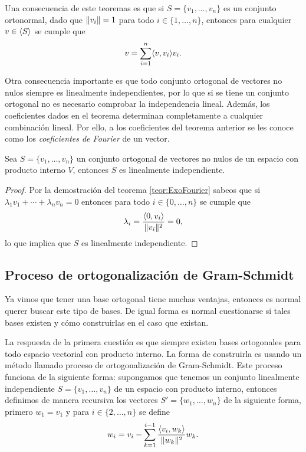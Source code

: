 Una consecuencia de este teoremas es que si $S = \{v_1, \ldots, v_n\}$ es un conjunto ortonormal, dado que $\mathopen\|v_i\mathclose\| = 1$ para todo $i\in\{1,\ldots,n\}$, entonces para cualquier $v\in \langle S\rangle$ se cumple que 
\[
  v = \sum_{i=1}^n \langle v,v_i\rangle v_i.
\]

Otra consecuencia importante es que todo conjunto ortogonal de vectores no nulos siempre es linealmente independientes, por lo que si se tiene un conjunto ortogonal no es necesario comprobar la independencia lineal. Además, los coeficientes dados en el teorema determinan completamente a cualquier combinación lineal. Por ello, a los coeficientes del teorema anterior se les conoce como los \emph{coeficientes de Fourier} de un vector.

\begin{coro} \label{coro:IndepOrtog}
  Sea $S = \{v_1, \ldots, v_n\}$ un conjunto ortogonal de vectores no nulos de un espacio con producto interno $V$, entonces $S$ es linealmente independiente.
\end{coro}
\begin{proof}
  Por la demostración del teorema \ref{teor:ExoFourier} sabeos que si $\lambda_1 v_1 + \cdots + \lambda_n v_n = 0$ entonces para todo $i \in  \{0,\ldots,n\}$ se cumple que
    \[
      \lambda_i = \frac{\langle0,v_i\rangle}{\mathopen\|v_i\mathclose\|^2} = 0,
    \]
  lo que implica que $S$ es linealmente independiente.
\end{proof}



\subsection{Proceso de ortogonalización de Gram-Schmidt}

Ya vimos que tener una base ortogonal tiene muchas ventajas, entonces es normal querer buscar este tipo de bases. De igual forma es normal cuestionarse si tales bases existen y cómo construirlas en el caso que existan.

La respuesta de la primera cuestión es que siempre existen bases ortogonales para todo espacio vectorial con producto interno. La forma de construirla es usando un método llamado proceso de ortogonalización de Gram-Schmidt. Este proceso funciona de la siguiente forma: supongamos que tenemos un conjunto linealmente independiente $S = \{v_1,\ldots,v_n\}$ de un espacio con producto interno, entonces definimos de manera recursiva los vectores $S' = \{w_1,\ldots,w_n\}$ de la siguiente forma, primero $w_1 = v_1$ y para $i \in \{2,\ldots,n\}$ se define
  \[
    w_i = v_i - \sum_{k=1}^{i-1} \frac{\langle v_i,w_k\rangle}{\mathopen\|w_k\mathclose\|^2} w_k.
  \]

